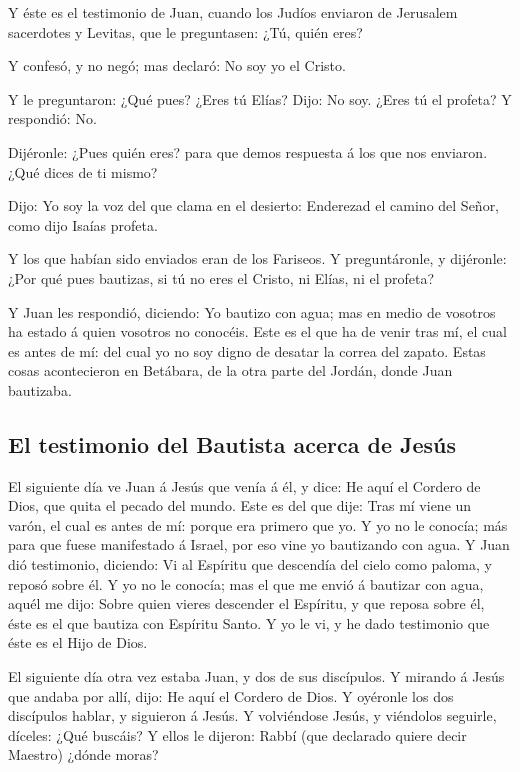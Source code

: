  Y éste es el testimonio de Juan, cuando los Judíos
enviaron de Jerusalem sacerdotes y Levitas, que le preguntasen: ¿Tú,
quién eres?

 Y confesó, y no negó; mas declaró: No soy yo el Cristo.

 Y le preguntaron: ¿Qué pues? ¿Eres tú Elías? Dijo: No soy.
¿Eres tú el profeta? Y respondió: No.~

 Dijéronle: ¿Pues quién eres? para que demos respuesta á
los que nos enviaron. ¿Qué dices de ti mismo?

 Dijo: Yo soy la voz del que clama en el desierto:
Enderezad el camino del Señor, como dijo Isaías profeta.

 Y los que habían sido enviados eran de los Fariseos.
 Y preguntáronle, y dijéronle: ¿Por qué pues bautizas, si
tú no eres el Cristo, ni Elías, ni el profeta?

 Y Juan les respondió, diciendo: Yo bautizo con agua; mas
en medio de vosotros ha estado á quien vosotros no conocéis.
 Este es el que ha de venir tras mí, el cual es antes de
mí: del cual yo no soy digno de desatar la correa del zapato.
 Estas cosas acontecieron en Betábara, de la otra parte del
Jordán, donde Juan bautizaba.

\hypertarget{el-testimonio-del-bautista-acerca-de-jesuxfas}{%
\subsection{El testimonio del Bautista acerca de
Jesús}\label{el-testimonio-del-bautista-acerca-de-jesuxfas}}

 El siguiente día ve Juan á Jesús que venía á él, y dice:
He aquí el Cordero de Dios, que quita el pecado del mundo. 
Este es del que dije: Tras mí viene un varón, el cual es antes de mí:
porque era primero que yo.  Y yo no le conocía; más para
que fuese manifestado á Israel, por eso vine yo bautizando con agua.
 Y Juan dió testimonio, diciendo: Vi al Espíritu que
descendía del cielo como paloma, y reposó sobre él.  Y yo
no le conocía; mas el que me envió á bautizar con agua, aquél me dijo:
Sobre quien vieres descender el Espíritu, y que reposa sobre él, éste es
el que bautiza con Espíritu Santo.  Y yo le vi, y he dado
testimonio que éste es el Hijo de Dios.

 El siguiente día otra vez estaba Juan, y dos de sus
discípulos.  Y mirando á Jesús que andaba por allí, dijo:
He aquí el Cordero de Dios.  Y oyéronle los dos discípulos
hablar, y siguieron á Jesús.  Y volviéndose Jesús, y
viéndolos seguirle, díceles: ¿Qué buscáis? Y ellos le dijeron: Rabbí
(que declarado quiere decir Maestro) ¿dónde moras?

